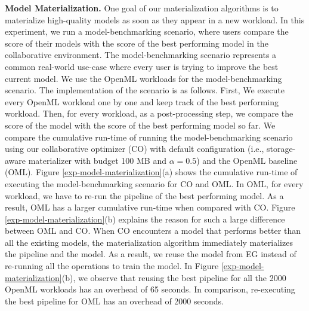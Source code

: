 \textbf{Model Materialization. }
One goal of our materialization algorithms is to materialize high-quality models as soon as they appear in a new workload.
In this experiment, we run a model-benchmarking scenario, where users compare the score of their models with the score of the best performing model in the collaborative environment.
The model-benchmarking scenario represents a common real-world use-case where every user is trying to improve the best current model.
We use the OpenML workloads for the model-benchmarking scenario.
The implementation of the scenario is as follows.
First, We execute every OpenML workload one by one and keep track of the best performing workload.
Then, for every workload, as a post-processing step, we compare the score of the model with the score of the best performing model so far.
We compare the cumulative run-time of running the model-benchmarking scenario using our collaborative optimizer (CO) with default configuration (i.e., storage-aware materializer with budget 100 MB and $\alpha=0.5$) and the OpenML baseline (OML).
Figure \ref{exp-model-materialization}(a) shows the cumulative run-time of executing the model-benchmarking scenario for CO and OML.
In OML, for every workload, we have to re-run the pipeline of the best performing model.
As a result, OML has a larger cumulative run-time when compared with CO.
Figure \ref{exp-model-materialization}(b) explains the reason for such a large difference between OML and CO.
When CO encounters a model that performs better than all the existing models, the materialization algorithm immediately materializes the pipeline and the model.
As a result, we reuse the model from EG instead of re-running all the operations to train the model.
In Figure \ref{exp-model-materialization}(b), we observe that reusing the best pipeline for all the 2000 OpenML workloads has an overhead of 65 seconds.
In comparison, re-executing the best pipeline for OML has an overhead of 2000 seconds.

